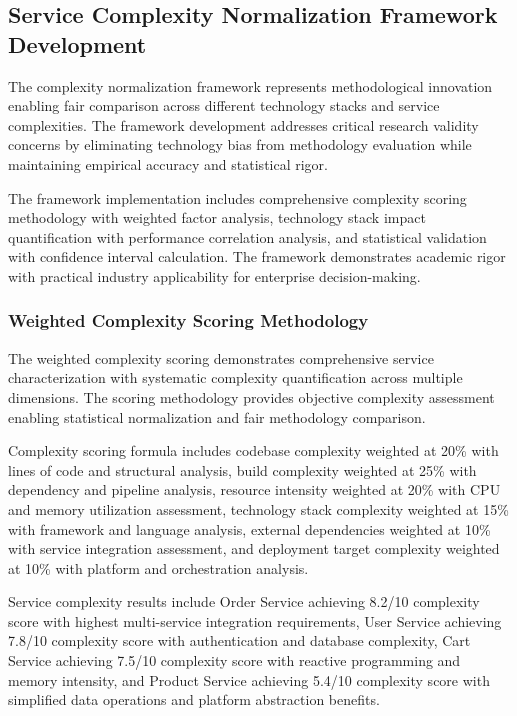 \subsection{Service Complexity Normalization Framework Development}
\label{subsec:complexity_framework}

The complexity normalization framework represents methodological innovation enabling fair comparison across different technology stacks and service complexities. The framework development addresses critical research validity concerns by eliminating technology bias from methodology evaluation while maintaining empirical accuracy and statistical rigor.

The framework implementation includes comprehensive complexity scoring methodology with weighted factor analysis, technology stack impact quantification with performance correlation analysis, and statistical validation with confidence interval calculation. The framework demonstrates academic rigor with practical industry applicability for enterprise decision-making.

\subsubsection{Weighted Complexity Scoring Methodology}

The weighted complexity scoring demonstrates comprehensive service characterization with systematic complexity quantification across multiple dimensions. The scoring methodology provides objective complexity assessment enabling statistical normalization and fair methodology comparison.

Complexity scoring formula includes codebase complexity weighted at 20\% with lines of code and structural analysis, build complexity weighted at 25\% with dependency and pipeline analysis, resource intensity weighted at 20\% with CPU and memory utilization assessment, technology stack complexity weighted at 15\% with framework and language analysis, external dependencies weighted at 10\% with service integration assessment, and deployment target complexity weighted at 10\% with platform and orchestration analysis.

Service complexity results include Order Service achieving 8.2/10 complexity score with highest multi-service integration requirements, User Service achieving 7.8/10 complexity score with authentication and database complexity, Cart Service achieving 7.5/10 complexity score with reactive programming and memory intensity, and Product Service achieving 5.4/10 complexity score with simplified data operations and platform abstraction benefits.

